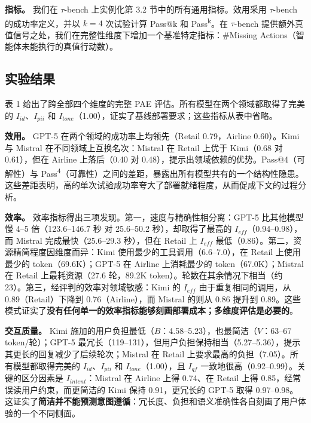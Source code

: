 \documentclass[11pt,UTF8,fontset=fandol]{ctexart}
\begin{document}
\textbf{指标。} 我们在 $\tau$-bench 上实例化第 3.2 节中的所有通用指标。效用采用 $\tau$-bench 的成功率定义，并以 $k=4$ 次试验计算 Pass@k 和 Pass\textsuperscript{k}。在 $\tau$-bench 提供额外真值信号之处，我们在完整性维度下增加一个基准特定指标：\#Missing Actions（智能体未能执行的真值行动数）。

\subsection{实验结果}

表 1 给出了跨全部四个维度的完整 PAE 评估。所有模型在两个领域都取得了完美的 $I_{id}$、$I_{pii}$ 和 $I_{tone}$（1.00），证实了基线部署要求；这些指标从表中省略。

\textbf{效用。} GPT-5 在两个领域的成功率上均领先（Retail 0.79，Airline 0.60）。Kimi 与 Mistral 在不同领域上互换名次：Mistral 在 Retail 上优于 Kimi（0.68 对 0.61），但在 Airline 上落后（0.40 对 0.48），提示出领域依赖的优势。Pass@4（可解性）与 Pass\textsuperscript{4}（可靠性）之间的差距，暴露出所有模型共有的一个结构性隐患。这些差距表明，高的单次试验成功率夸大了部署就绪程度，从而促成下文的过程分析。

\textbf{效率。} 效率指标得出三项发现。第一，速度与精确性相分离：GPT-5 比其他模型慢 4--5 倍（123.6--146.7 秒 对 25.6--50.2 秒），却取得了最高的 $I_{eff}$（0.94--0.98），而 Mistral 完成最快（25.6--29.3 秒），但在 Retail 上 $I_{eff}$ 最低（0.86）。第二，资源精简程度因维度而异：Kimi 使用最少的工具调用（6.6--7.0），在 Retail 上使用最少的 token（69.6K）；GPT-5 在 Airline 上消耗最少的 token（67.0K）；Mistral 在 Retail 上最耗资源（27.6 轮，89.2K token）。轮数在其余情况下相当（约 23）。第三，经评判的效率对领域敏感：Kimi 的 $I_{eff}$ 由于重复相同的调用，从 0.89（Retail）下降到 0.76（Airline），而 Mistral 的则从 0.86 提升到 0.89。这些模式证实了\textbf{没有任何单一的效率指标能够刻画部署成本；多维度评估是必要的}。

\textbf{交互质量。} Kimi 施加的用户负担最低（$B$：4.58--5.23），也最简洁（$V$：63--67 token/轮）；GPT-5 最冗长（119--131），但用户负担保持相当（5.27--5.36），提示其更长的回复减少了后续轮次；Mistral 在 Retail 上要求最高的负担（7.05）。所有模型都取得完美的 $I_{id}$、$I_{pii}$ 和 $I_{tone}$（1.00），且 $I_{qf}$ 一致地很高（0.92--0.99）。关键的区分因素是 $I_{intent}$：Mistral 在 Airline 上得 0.74、在 Retail 上得 0.85，经常误读用户约束，而更简洁的 Kimi 保持 0.91，更冗长的 GPT-5 取得 0.97--0.98。这证实了\textbf{简洁并不能预测意图遵循}：冗长度、负担和语义准确性各自刻画了用户体验的一个不同侧面。
\end{document}
